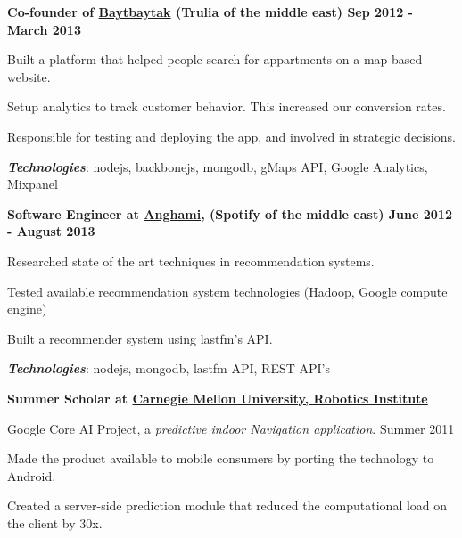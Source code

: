 \documentclass[10pt]{article}
\newenvironment{innerlist}[1][\enskip\textbullet]%
        {\begin{compactitem}[#1]}{\end{compactitem}}
\begin{document}
\vspace{0.4cm}


\textbf{Co-founder of \href{http://baytbaytak.com}{Baytbaytak} (Trulia of the middle east) \hfill \small Sep 2012 - March 2013} 
\vspace{0.1cm}
\begin{innerlist}
\item Built a platform that helped people search for appartments on a map-based website.  
\item Setup analytics to track customer behavior. This increased our conversion rates. 
\item Responsible for testing and deploying the app, and involved in strategic decisions.
\end{innerlist}

\vspace{0.2cm}
\hspace{0.25cm}\textbf{\textit{Technologies}}: 
nodejs, backbonejs, mongodb, gMaps API, Google Analytics, Mixpanel

\vspace{0.4cm}

\textbf{
  Software Engineer at \href{http://anghami.com/}{Anghami}, (Spotify of the middle east)
  \hfill \small June 2012 - August 2013
}
\vspace{0.1cm}
\begin{innerlist}
\item Researched state of the art techniques in recommendation systems.
\item Tested available recommendation system technologies (Hadoop, Google compute engine)
\item Built a recommender system using lastfm's API.
\end{innerlist}


\vspace{0.2cm}
\hspace{0.25cm}\textbf{\textit{Technologies}}: 
nodejs, mongodb, lastfm API, REST API's

\vspace{0.4cm}

\textbf{Summer Scholar at \href{http://www.ri.cmu.edu/}{Carnegie Mellon University, Robotics Institute}}

\vspace{0.1cm}

Google Core AI Project, a \textit{predictive indoor Navigation application}.
\hfill \small Summer 2011

\vspace{0.1cm}
\begin{innerlist}
\item Made the product available to mobile consumers by porting the technology to Android.
\item Created a server-side prediction module that reduced the computational load on the client by 30x.
\end{innerlist}
\end{document}
